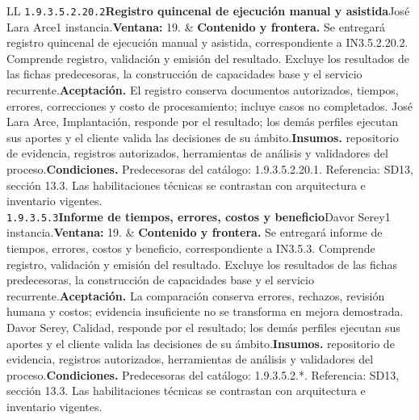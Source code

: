 \begin{longtable}{L{\tabcolsep\relax}L{\tabcolsep\relax}}
\texttt{1.\allowbreak{}9.\allowbreak{}3.\allowbreak{}5.\allowbreak{}2.\allowbreak{}20.\allowbreak{}2}\newline{}\textbf{Registro quincenal de ejecución manual y asistida}\newline{}José Lara Arce\newline{}1 instancia.\newline{}\textbf{Ventana:} 19. & \textbf{Contenido y frontera.} Se entregará registro quincenal de ejecución manual y asistida, correspondiente a IN3.5.2.20.2. Comprende registro, validación y emisión del resultado. Excluye los resultados de las fichas predecesoras, la construcción de capacidades base y el servicio recurrente.\newline{}\textbf{Aceptación.} El registro conserva documentos autorizados, tiempos, errores, correcciones y costo de procesamiento; incluye casos no completados. José Lara Arce, Implantación, responde por el resultado; los demás perfiles ejecutan sus aportes y el cliente valida las decisiones de su ámbito.\newline{}\textbf{Insumos.} repositorio de evidencia, registros autorizados, herramientas de análisis y validadores del proceso.\newline{}\textbf{Condiciones.} Predecesoras del catálogo: 1.9.3.5.2.20.1. Referencia: SD13, sección 13.3. Las habilitaciones técnicas se contrastan con arquitectura e inventario vigentes.\\\hline
\texttt{1.\allowbreak{}9.\allowbreak{}3.\allowbreak{}5.\allowbreak{}3}\newline{}\textbf{Informe de tiempos, errores, costos y beneficio}\newline{}Davor Serey\newline{}1 instancia.\newline{}\textbf{Ventana:} 19. & \textbf{Contenido y frontera.} Se entregará informe de tiempos, errores, costos y beneficio, correspondiente a IN3.5.3. Comprende registro, validación y emisión del resultado. Excluye los resultados de las fichas predecesoras, la construcción de capacidades base y el servicio recurrente.\newline{}\textbf{Aceptación.} La comparación conserva errores, rechazos, revisión humana y costos; evidencia insuficiente no se transforma en mejora demostrada. Davor Serey, Calidad, responde por el resultado; los demás perfiles ejecutan sus aportes y el cliente valida las decisiones de su ámbito.\newline{}\textbf{Insumos.} repositorio de evidencia, registros autorizados, herramientas de análisis y validadores del proceso.\newline{}\textbf{Condiciones.} Predecesoras del catálogo: 1.9.3.5.2.*. Referencia: SD13, sección 13.3. Las habilitaciones técnicas se contrastan con arquitectura e inventario vigentes.\\\hline

\end{longtable}
